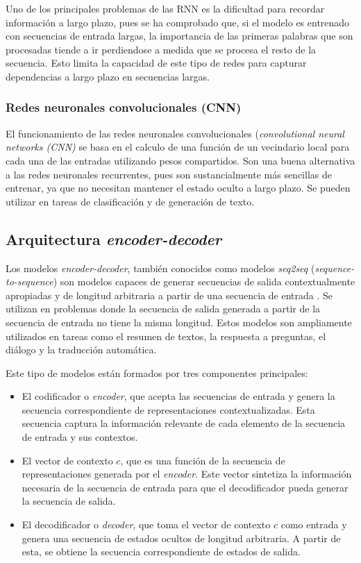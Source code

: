 \documentclass[11pt,spanish,listoffigures,listoftables]{tfgetsinf}
\begin{document}
Uno de los principales problemas de las RNN es la dificultad para recordar información a largo plazo, pues se ha comprobado que, si el modelo es entrenado con secuencias de entrada largas, la importancia de las primeras palabras que son procesadas tiende a ir perdiendose a medida que se procesa el resto de la secuencia. Esto limita la capacidad de este tipo de redes para capturar dependencias a largo plazo en secuencias largas.

\subsubsection{Redes neuronales convolucionales (CNN)}
El funcionamiento de las redes neuronales convolucionales (\textit{convolutional neural networks (CNN)} se basa en el calculo de una función de un vecindario local para cada una de las entradas utilizando pesos compartidos. Son una buena alternativa a las redes neuronales recurrentes, pues son sustancialmente más sencillas de entrenar, ya que no necesitan mantener el estado oculto a largo plazo. Se pueden utilizar en tareas de clasificación y de generación de texto.

\subsection{Arquitectura \textit{encoder-decoder}}

Los modelos \textit{encoder-decoder}, también conocidos como modelos \textit{seq2seq} (\textit{sequence-to-sequence}) son modelos capaces de generar secuencias de salida contextualmente apropiadas y de longitud arbitraria a partir de una secuencia de entrada \cite{jurafsky2023speech}. Se utilizan en problemas donde la secuencia de salida generada a partir de la secuencia de entrada no tiene la misma longitud. Estos modelos son ampliamente utilizados en tareas como el resumen de textos, la respuesta a preguntas, el diálogo y la traducción automática.

Este tipo de modelos están formados por tres componentes principales:

\begin{itemize}
	\item El codificador o \textit{encoder}, que acepta las secuencias de entrada y genera la secuencia correspondiente de representaciones contextualizadas. Esta secuencia captura la información relevante de cada elemento de la secuencia de entrada y sus contextos.
	\item El vector de contexto $c$, que es una función de la secuencia de representaciones generada por el \textit{encoder}. Este vector sintetiza la información necesaria de la secuencia de entrada para que el decodificador pueda generar la secuencia de salida.
	\item El decodificador o \textit{decoder}, que toma el vector de contexto $c$ como entrada y genera una secuencia de estados ocultos de longitud arbitraria. A partir de esta, se obtiene la secuencia correspondiente de estados de salida.
\end{itemize}
\end{document}

